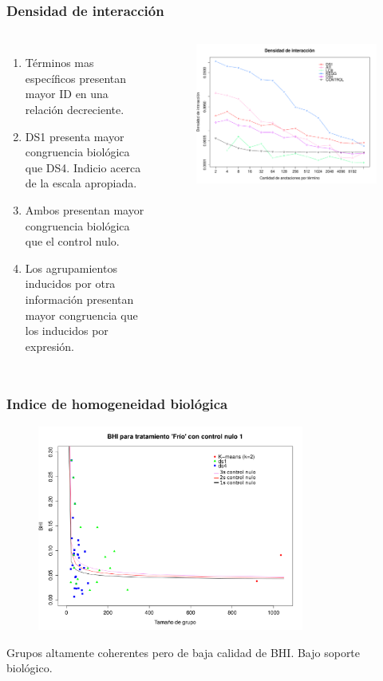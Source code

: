 \documentclass[serif,9pt, t]{beamer}
\newcommand\Fontvi{\fontsize{7}{7.2}\selectfont}
\begin{document}
\begin{frame}\frametitle{Densidad de interacción} 
\begin{columns}[T]
	\Fontvi
	\begin{enumerate}
	\item Términos mas específicos presentan mayor ID en una relación decreciente.
	\item DS1 presenta mayor congruencia biológica que DS4. Indicio acerca de la escala apropiada.
	\item Ambos presentan mayor congruencia biológica que el control nulo.
	\item Los agrupamientos inducidos por otra información presentan mayor congruencia que los inducidos por expresión.
	\end{enumerate}
	\begin{figure}
	    	\centering
		\includegraphics[width=1\textwidth]{interacting_densities_bpb.pdf}
	\end{figure}
\end{columns}
\end{frame}

\begin{frame}\frametitle{Indice de homogeneidad biológica} 
\begin{figure}
    	\centering
	\includegraphics[width=0.78\textwidth]{bhi_km_ds1_ds4_control1.png}
\end{figure}
\Fontvi
\centering
Grupos altamente coherentes pero de baja calidad de BHI. Bajo soporte biológico.
\end{frame}
\end{document}
